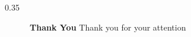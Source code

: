 \STANDARD{}
{
	\begin{columns}
		\begin{column}{0.35\textwidth}
			\begin{block}{~~~~~~\textbf{Thank You}}
				\centering
				Thank you for your attention
			\end{block}
		\end{column}
	\end{columns}
}

